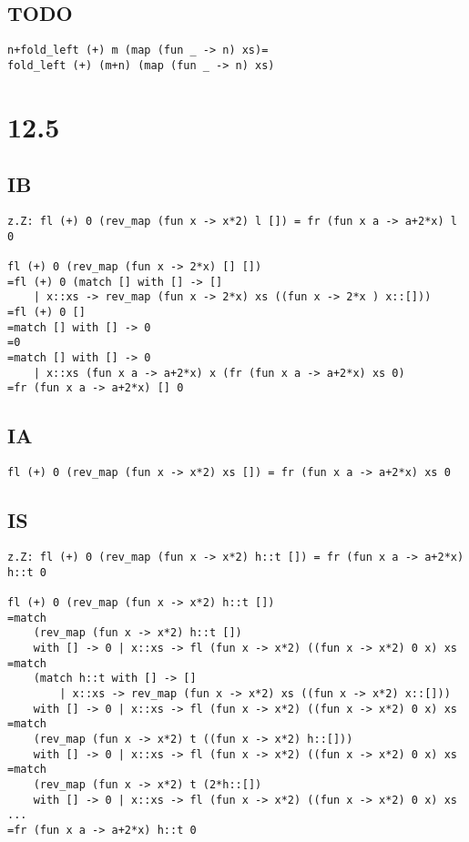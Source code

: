 \documentclass{article}
\begin{document}
\subsection*{TODO}

\begin{lstlisting}
n+fold_left (+) m (map (fun _ -> n) xs)=
fold_left (+) (m+n) (map (fun _ -> n) xs)
\end{lstlisting}

\section*{12.5}

\subsection*{IB}

\begin{lstlisting}
z.Z: fl (+) 0 (rev_map (fun x -> x*2) l []) = fr (fun x a -> a+2*x) l 0

fl (+) 0 (rev_map (fun x -> 2*x) [] [])
=fl (+) 0 (match [] with [] -> []
	| x::xs -> rev_map (fun x -> 2*x) xs ((fun x -> 2*x ) x::[]))
=fl (+) 0 []
=match [] with [] -> 0
=0
=match [] with [] -> 0
	| x::xs (fun x a -> a+2*x) x (fr (fun x a -> a+2*x) xs 0)
=fr (fun x a -> a+2*x) [] 0
\end{lstlisting}

\subsection*{IA}

\begin{lstlisting}
fl (+) 0 (rev_map (fun x -> x*2) xs []) = fr (fun x a -> a+2*x) xs 0
\end{lstlisting}

\subsection*{IS}

\begin{lstlisting}
z.Z: fl (+) 0 (rev_map (fun x -> x*2) h::t []) = fr (fun x a -> a+2*x) h::t 0

fl (+) 0 (rev_map (fun x -> x*2) h::t [])
=match
	(rev_map (fun x -> x*2) h::t [])
	with [] -> 0 | x::xs -> fl (fun x -> x*2) ((fun x -> x*2) 0 x) xs
=match
	(match h::t with [] -> []
		| x::xs -> rev_map (fun x -> x*2) xs ((fun x -> x*2) x::[]))
	with [] -> 0 | x::xs -> fl (fun x -> x*2) ((fun x -> x*2) 0 x) xs
=match
	(rev_map (fun x -> x*2) t ((fun x -> x*2) h::[]))
	with [] -> 0 | x::xs -> fl (fun x -> x*2) ((fun x -> x*2) 0 x) xs
=match
	(rev_map (fun x -> x*2) t (2*h::[])
	with [] -> 0 | x::xs -> fl (fun x -> x*2) ((fun x -> x*2) 0 x) xs
...
=fr (fun x a -> a+2*x) h::t 0
\end{lstlisting}
\end{document}
